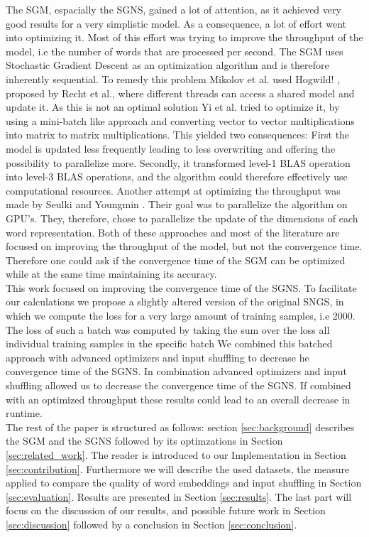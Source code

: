 The SGM, espacially the SGNS, gained a lot of attention, as it achieved very good results for a very simplistic model. As a consequence, a lot of effort went into optimizing it. Most of this effort was trying to improve the throughput of the model, i.e the number of words that are processed per second. The SGM uses Stochastic Gradient Descent as an optimization algorithm and is therefore inherently sequential. To remedy this problem Mikolov et al. used Hogwild! \citep{hogwild}, proposed by Recht et al., where different threads can access a shared model and update it. As this is not an optimal solution Yi et al. \citep{intel} tried to optimize it, by using a mini-batch like approach and converting vector to vector multiplications into matrix to matrix multiplications. This yielded two consequences: First the model is updated less frequently leading to less overwriting and offering the possibility to parallelize more. Secondly, it transformed level-1 BLAS operation into level-3 BLAS operations, and the algorithm could therefore effectively use computational resources. Another attempt at optimizing the throughput was made by Seulki and Youngmin \citep{gpu}. Their goal was to parallelize the algorithm on GPU's. They, therefore, chose to parallelize the update of the dimensions of each word representation. Both of these approaches and most of the literature are focused on improving the throughput of the model, but not the convergence time.  Therefore one could ask if the convergence time of the SGM can be optimized while at the same time maintaining its accuracy.\\
This work focused on improving the convergence time of the SGNS. To facilitate our calculations we propose a slightly altered version of the original SNGS, in which we compute the loss for a very large amount of training samples, i.e 2000. The loss of such a batch was computed by taking the sum over the loss all individual training samples in the specific batch We combined this batched approach with advanced optimizers and input shuffling to decrease he convergence time of the SGNS. In combination advanced optimizers and input shuffling allowed us to decrease the convergence time of the SGNS. If combined with an optimized throughput these results could lead to an overall decrease in runtime.\\
 The rest of the paper is structured as follows: section \ref{sec:background}  describes the SGM and the SGNS followed by its optimzations in Section \ref{sec:related_work}.  The reader is introduced to our Implementation in Section \ref{sec:contribution}. Furthermore  we will describe the used datasets, the measure applied to compare the quality of word embeddings and input shuffling in Section \ref{sec:evaluation}. Results are presented in  Section \ref{sec:results}. The last part will focus on the discussion of our results, and possible future work in Section \ref{sec:discussion} followed by a conclusion in Section \ref{sec:conclusion}.